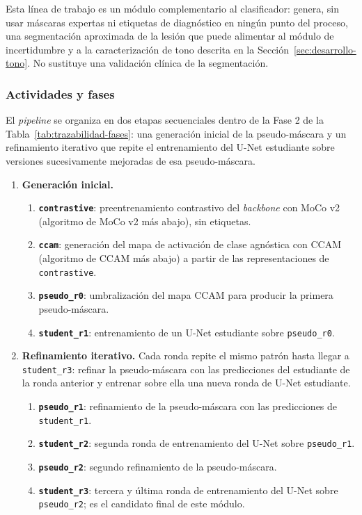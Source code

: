 Esta línea de trabajo es un módulo complementario al clasificador: genera, sin usar máscaras expertas ni etiquetas de diagnóstico en ningún punto del proceso, una segmentación aproximada de la lesión que puede alimentar al módulo de incertidumbre y a la caracterización de tono descrita en la Sección~\ref{sec:desarrollo-tono}. No sustituye una validación clínica de la segmentación.

\subsubsection{Actividades y fases}

El \textit{pipeline} se organiza en dos etapas secuenciales dentro de la Fase 2 de la Tabla~\ref{tab:trazabilidad-fases}: una generación inicial de la pseudo-máscara y un refinamiento iterativo que repite el entrenamiento del U-Net estudiante sobre versiones sucesivamente mejoradas de esa pseudo-máscara.

\begin{enumerate}
    \item \textbf{Generación inicial.}
    \begin{enumerate}
        \item \textbf{\texttt{contrastive}}: preentrenamiento contrastivo del \textit{backbone} con MoCo v2 (algoritmo de MoCo v2 más abajo), sin etiquetas.
        \item \textbf{\texttt{ccam}}: generación del mapa de activación de clase agnóstica con CCAM (algoritmo de CCAM más abajo) a partir de las representaciones de \texttt{contrastive}.
        \item \textbf{\texttt{pseudo\_r0}}: umbralización del mapa CCAM para producir la primera pseudo-máscara.
        \item \textbf{\texttt{student\_r1}}: entrenamiento de un U-Net estudiante sobre \texttt{pseudo\_r0}.
    \end{enumerate}
    \item \textbf{Refinamiento iterativo.} Cada ronda repite el mismo patrón hasta llegar a \texttt{student\_r3}: refinar la pseudo-máscara con las predicciones del estudiante de la ronda anterior y entrenar sobre ella una nueva ronda de U-Net estudiante.
    \begin{enumerate}
        \item \textbf{\texttt{pseudo\_r1}}: refinamiento de la pseudo-máscara con las predicciones de \texttt{student\_r1}.
        \item \textbf{\texttt{student\_r2}}: segunda ronda de entrenamiento del U-Net sobre \texttt{pseudo\_r1}.
        \item \textbf{\texttt{pseudo\_r2}}: segundo refinamiento de la pseudo-máscara.
        \item \textbf{\texttt{student\_r3}}: tercera y última ronda de entrenamiento del U-Net sobre \texttt{pseudo\_r2}; es el candidato final de este módulo.
    \end{enumerate}
\end{enumerate}

